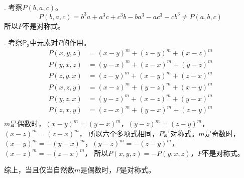 \documentclass[12pt,UTF8]{ctexbook}
\begin{document}
\begin{so}
    \mbox{} \\
    . 考察$P(b, a, c)$。
    $$  P(b, a, c) = b^3a + a^3c + c^3b - ba^3 - ac^3 - cb^3 \neq P(a, b, c) $$
    所以$P$不是对称式。

    . 考察$\mathbb{P}_3$中元素对$P$的作用。
    \begin{align*}
        P(x, y, z) &= (x - y)^m + (z - y)^m + (x - z)^m \\
        P(y, x, z) &= (y - x)^m + (z - x)^m + (y - z)^m \\
        P(z, y, x) &= (z - y)^m + (x - y)^m + (z - x)^m \\
        P(x, z, y) &= (x - z)^m + (y - z)^m + (x - y)^m \\
        P(y, z, x) &= (y - z)^m + (x - z)^m + (y - x)^m \\
        P(z, x, y) &= (z - x)^m + (y - x)^m + (z - y)^m \\
    \end{align*}
    $m$是偶数时，$(x - y)^m = (y - x)^m$，$(y - z)^m = (z - y)^m$，$(x - z)^m = (z - x)^m$，
    所以六个多项式相同，$P$是对称式。$m$是奇数时，$(x - y)^m = -(y - x)^m$，$(y - z)^m = -(z - y)^m$，$(x - z)^m = -(z - x)^m$，
    所以$P(x, y, z) = -P(y, x, z) $，$P$不是对称式。

    综上，当且仅当自然数$m$是偶数时，$P$是对称式。
\end{so}




\end{document}
